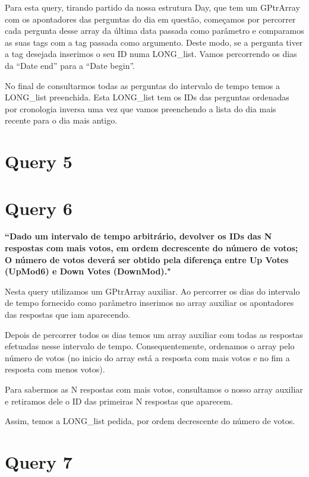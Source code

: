 \documentclass[a4paper]{report}
\begin{document}
Para esta query, tirando partido da nossa estrutura Day, que tem um GPtrArray com
os apontadores das perguntas do dia em questão, começamos por percorrer cada pergunta desse array
da última data passada como parâmetro e comparamos as suas tags com a tag passada como argumento.
Deste modo, se a pergunta tiver a tag desejada inserimos o seu ID numa LONG\_list.
Vamos percorrendo os dias da “Date end” para a “Date begin”.

No final de consultarmos todas as perguntas do intervalo de tempo temos a LONG\_list preenchida.
Esta LONG\_list tem os IDs das perguntas ordenadas por cronologia inversa uma vez que
vamos preenchendo a lista do dia mais recente para o dia mais antigo.



\section{Query 5}
\label{sec:query5}

\section{Query 6}
\label{sec:query6}

\textbf{“Dado um intervalo de tempo arbitrário, devolver os IDs das N respostas
com mais votos, em ordem decrescente do número de votos; O número de votos deverá
ser obtido pela diferença entre Up Votes (UpMod6) e Down Votes (DownMod)."}

Nesta query utilizamos um GPtrArray auxiliar. Ao percorrer os dias do intervalo
de tempo fornecido como parâmetro inserimos no array auxiliar os apontadores das
respostas que iam aparecendo.

Depois de percorrer todos os dias temos um array auxiliar com todas as respostas
efetuadas nesse intervalo de tempo. Consequentemente, ordenamos o array pelo número
de votos (no inicio do array está a resposta com mais votos e no fim a resposta com menos votos).

Para sabermos as N respostas com mais votos, consultamos o nosso array auxiliar
e retiramos dele o ID das primeiras N respostas que aparecem.

Assim, temos a LONG\_list pedida, por ordem decrescente do número de votos.



\section{Query 7}
\label{sec:query7}
\end{document}

